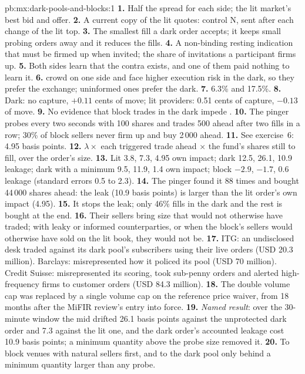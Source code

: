 \begin{solution}{pb:mx:dark-pools-and-blocks:1}
\textbf{1.} Half the spread for each side; the lit market's best bid and offer.
\textbf{2.} A current copy of the lit quotes: control N, sent after each change of the lit top.
\textbf{3.} The smallest fill a dark order accepts; it keeps small probing orders away and it reduces the fills.
\textbf{4.} A non-binding resting indication that must be firmed up when invited; the share of invitations a participant firms up.
\textbf{5.} Both sides learn that the contra exists, and one of them paid nothing to learn it.
\textbf{6.}  crowd on one side and face higher execution risk in the dark, so they prefer the exchange; uninformed ones prefer the dark.
\textbf{7.} 6.3\% and 17.5\%.
\textbf{8.} Dark: no capture, $+0.11$ cents of move; lit providers: 0.51 cents of capture, $-0.13$ of move.
\textbf{9.} No evidence that block trades in the dark impede .
\textbf{10.} The pinger probes every two seconds with 100 shares and trades 500 ahead after two fills in a row; 30\% of block sellers never firm up and buy
2\,000 ahead.
\textbf{11.} See exercise~6: 4.95 basis points.
\textbf{12.} $\lambda\times$ each triggered trade ahead $\times$ the fund's shares still to fill, over the order's size.
\textbf{13.} Lit 3.8, 7.3, 4.95 own impact; dark 12.5, 26.1, 10.9 leakage; dark with a minimum 9.5, 11.9, 1.4 own impact; block $-2.9$, $-1.7$, 0.6
leakage (standard errors 0.5 to 2.3).
\textbf{14.} The pinger found it 88 times and bought 44\,000 shares ahead: the leak (10.9 basis points) is larger than the lit order's own impact (4.95).
\textbf{15.} It stops the leak; only 46\% fills in the dark and the rest is bought at the end.
\textbf{16.} Their sellers bring size that would not otherwise have traded; with leaky or informed counterparties, or when the block's sellers would
otherwise have sold on the lit book, they would not be.
\textbf{17.} ITG: an undisclosed desk traded against its dark pool's subscribers using their live orders (USD 20.3 million). Barclays: misrepresented how
it policed its pool (USD 70 million). Credit Suisse: misrepresented its scoring, took sub-penny orders and alerted high-frequency firms to customer
orders (USD 84.3 million).
\textbf{18.} The double volume cap was replaced by a single volume cap on the reference price waiver, from 18 months after the MiFIR review's entry into
force.
\textbf{19.} \emph{Named result}: over the 30-minute window the mid drifted 26.1 basis points against the unprotected dark order and 7.3 against the lit
one, and the dark order's accounted leakage cost 10.9 basis points; a minimum quantity above the probe size removed it.
\textbf{20.} To block venues with natural sellers first, and to the dark pool only behind a minimum quantity larger than any probe.
\end{solution}

